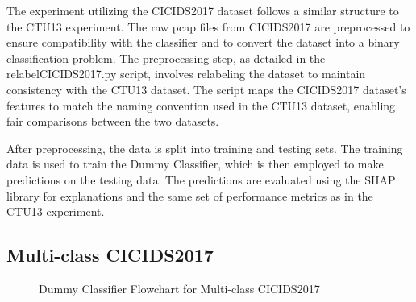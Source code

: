 The experiment utilizing the CICIDS2017 dataset follows a similar structure to the CTU13 experiment. The raw pcap files from CICIDS2017 are preprocessed to ensure compatibility with the classifier and to convert the dataset into a binary classification problem. The preprocessing step, as detailed in the relabelCICIDS2017.py script, involves relabeling the dataset to maintain consistency with the CTU13 dataset. The script maps the CICIDS2017 dataset's features to match the naming convention used in the CTU13 dataset, enabling fair comparisons between the two datasets.

After preprocessing, the data is split into training and testing sets. The training data is used to train the Dummy Classifier, which is then employed to make predictions on the testing data. The predictions are evaluated using the SHAP library for explanations and the same set of performance metrics as in the CTU13 experiment.

\subsection{Multi-class CICIDS2017}

\begin{figure}[H]
\centering
{}
\caption{Dummy Classifier Flowchart for Multi-class CICIDS2017}\label{fig:DummyRandomFlowMultiCICIDS2017}
\end{figure}

